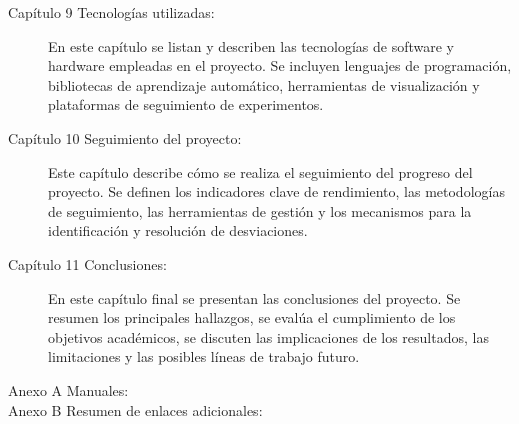\begin{description}
\item[Capítulo 9 Tecnologías utilizadas:] En este capítulo se listan y describen las tecnologías de software y hardware empleadas en el proyecto. Se incluyen lenguajes de programación, bibliotecas de aprendizaje automático, herramientas de visualización y plataformas de seguimiento de experimentos.

\item[Capítulo 10 Seguimiento del proyecto:] Este capítulo describe cómo se realiza el seguimiento del progreso del proyecto. Se definen los indicadores clave de rendimiento, las metodologías de seguimiento, las herramientas de gestión y los mecanismos para la identificación y resolución de desviaciones.

\item[Capítulo 11 Conclusiones:] En este capítulo final se presentan las conclusiones del proyecto. Se resumen los principales hallazgos, se evalúa el cumplimiento de los objetivos académicos, se discuten las implicaciones de los resultados, las limitaciones y las posibles líneas de trabajo futuro.
\item[Anexo A Manuales:]
\item[Anexo B Resumen de enlaces adicionales:]
\end{description}
